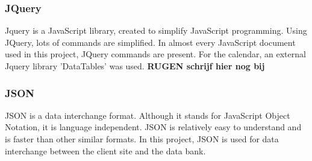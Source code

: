\subsubsection{JQuery}
Jquery is a JavaScript library, created to simplify JavaScript programming. Using JQuery, lots of commands are simplified. In almost every JavaScript document used in this project, JQuery commands are present. 
For the calendar, an external Jquery library 'DataTables' was used. 
\textbf{RUGEN schrijf hier nog bij}

\subsubsection{JSON}
JSON is a data interchange format. Although it stands for JavaScript Object Notation, it is language independent. JSON is relatively easy to understand and is faster than other similar formats. In this project, JSON is used for data interchange between the client site and the data bank. 
